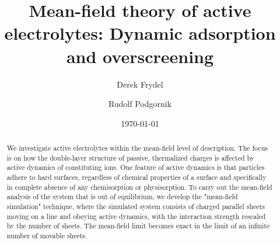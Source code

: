 \documentclass[pre,twocolumn,graphicx]{revtex4-1}
\begin{document}
\title{Mean-field theory of active electrolytes:  Dynamic adsorption and overscreening}


\author{Derek Frydel}
\author{Rudolf Podgornik}



\date{\today}

\begin{abstract}
We investigate active electrolytes within the mean-field level of description. The focus is on how the 
double-layer structure of passive, thermalized charges is affected by active dynamics of constituting 
ions. One feature of active dynamics is that particles adhere to hard surfaces, regardless of chemical 
properties of a surface and specifically in complete absence of any chemisorption or physisorption. 
To carry out the mean-field analysis of the system that is out of equilibrium, we develop the 
"mean-field simulation" technique, where the simulated system consists of charged parallel sheets 
moving on a line and obeying active dynamics, with the interaction strength rescaled by the number of 
sheets. The mean-field limit becomes exact in the limit of an infinite number of movable sheets.
\end{abstract}
\pacs{
}



\maketitle
\end{document}
